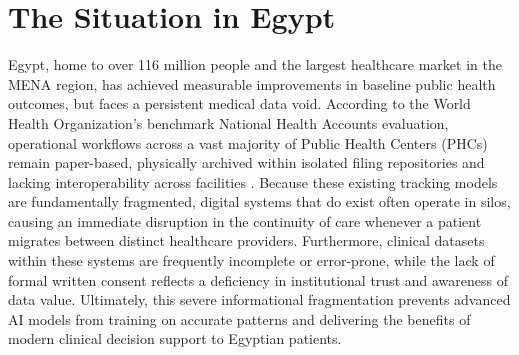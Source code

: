 \section{The Situation in Egypt}
\hspace*{2em}Egypt, home to over 116 million people \cite{world_bank_pop_2024} and the largest healthcare market in the \ac{MENA} region, 
has achieved measurable improvements in baseline public health outcomes, but faces a persistent medical data void.
According to the World Health Organization's benchmark National Health Accounts evaluation, operational workflows across a vast majority 
of Public Health Centers (PHCs) remain paper-based, physically archived within isolated filing repositories and lacking interoperability across facilities \cite{who_egypt_nha}.
Because these existing tracking models are fundamentally fragmented,
digital systems that do exist often operate in silos, causing an immediate disruption in the continuity of care whenever a patient migrates between distinct healthcare providers. 
Furthermore, clinical datasets within these systems are frequently incomplete or error-prone, while the lack of formal written consent reflects a deficiency in institutional trust and awareness of data value. 
Ultimately, this severe informational fragmentation prevents advanced AI models from training on accurate patterns and delivering the benefits of modern clinical decision support to Egyptian patients.

